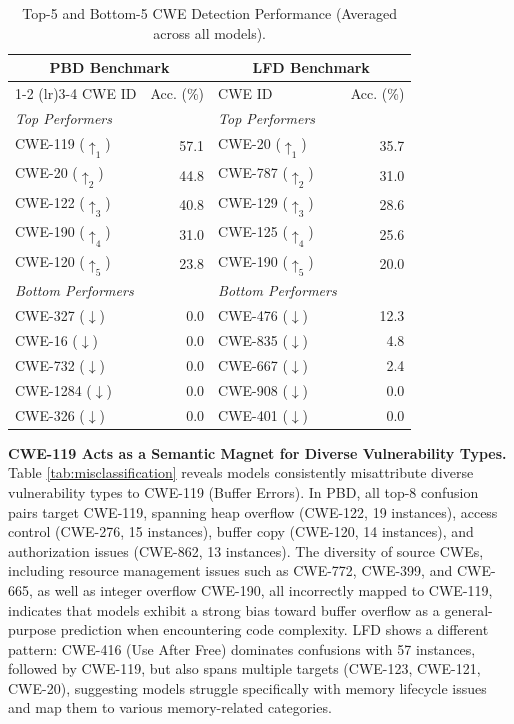 \documentclass[lettersize,journal]{IEEEtran}
\begin{document}
\begin{table}[!t]
    \centering
    \caption{Top-5 and Bottom-5 \gls{CWE} Detection Performance (Averaged across all models).}
    \label{tab:cwe_performance}
    \footnotesize
    \renewcommand{\arraystretch}{1.0}
    \setlength{\tabcolsep}{4pt}
    \begin{tabular*}{\columnwidth}{@{\extracolsep{\fill}}lrlr}
    \toprule
    \multicolumn{2}{c}{\textbf{PBD Benchmark}} & \multicolumn{2}{c}{\textbf{LFD Benchmark}} \\
    \cmidrule(lr){1-2} \cmidrule(lr){3-4}
    CWE ID & Acc. (\%) & CWE ID & Acc. (\%) \\
    \midrule
    \textit{Top Performers} & & \textit{Top Performers} & \\
    CWE-119 \tiny($\uparrow_1$) & 57.1 & CWE-20 \tiny($\uparrow_1$) & 35.7 \\
    CWE-20 \tiny($\uparrow_2$) & 44.8 & CWE-787 \tiny($\uparrow_2$) & 31.0 \\
    CWE-122 \tiny($\uparrow_3$) & 40.8 & CWE-129 \tiny($\uparrow_3$) & 28.6 \\
    CWE-190 \tiny($\uparrow_4$) & 31.0 & CWE-125 \tiny($\uparrow_4$) & 25.6 \\
    CWE-120 \tiny($\uparrow_5$) & 23.8 & CWE-190 \tiny($\uparrow_5$) & 20.0 \\
    \midrule
    \textit{Bottom Performers} & & \textit{Bottom Performers} & \\
    CWE-327 \tiny($\downarrow$) & 0.0 & CWE-476 \tiny($\downarrow$) & 12.3 \\
    CWE-16 \tiny($\downarrow$) & 0.0 & CWE-835 \tiny($\downarrow$) & 4.8 \\
    CWE-732 \tiny($\downarrow$) & 0.0 & CWE-667 \tiny($\downarrow$) & 2.4 \\
    CWE-1284 \tiny($\downarrow$) & 0.0 & CWE-908 \tiny($\downarrow$) & 0.0 \\
    CWE-326 \tiny($\downarrow$) & 0.0 & CWE-401 \tiny($\downarrow$) & 0.0 \\
    \bottomrule
    \end{tabular*}
\end{table}


\textbf{CWE-119 Acts as a Semantic Magnet for Diverse Vulnerability Types.} Table \ref{tab:misclassification} reveals models consistently misattribute diverse vulnerability types to CWE-119 (Buffer Errors). In PBD, all top-8 confusion pairs target CWE-119, spanning heap overflow (CWE-122, 19 instances), access control (CWE-276, 15 instances), buffer copy (CWE-120, 14 instances), and authorization issues (CWE-862, 13 instances). The diversity of source CWEs, including resource management issues such as CWE-772, CWE-399, and CWE-665, as well as integer overflow CWE-190, all incorrectly mapped to CWE-119, indicates that models exhibit a strong bias toward buffer overflow as a general-purpose prediction when encountering code complexity. LFD shows a different pattern: CWE-416 (Use After Free) dominates confusions with 57 instances, followed by CWE-119, but also spans multiple targets (CWE-123, CWE-121, CWE-20), suggesting models struggle specifically with memory lifecycle issues and map them to various memory-related categories.
\end{document}
